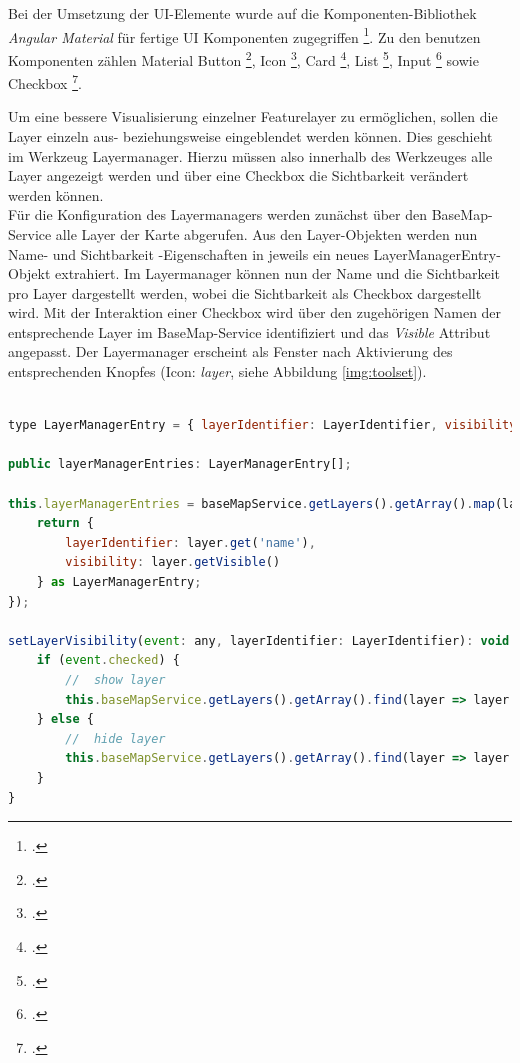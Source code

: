 Bei der Umsetzung der UI-Elemente wurde auf die Komponenten-Bibliothek \emph{Angular Material} für fertige UI Komponenten zugegriffen \footcite{team_angular_material}.
Zu den benutzen Komponenten zählen Material Button \footcite{team_angular_material_button}, Icon \footcite{team_angular_material_icon}, Card \footcite{team_angular_material_card}, List \footcite{team_angular_material_list}, Input \footcite{team_angular_material_input} sowie Checkbox \footcite{team_angular_material_checkbox}.

Um eine bessere Visualisierung einzelner Featurelayer zu ermöglichen, sollen die Layer einzeln aus- beziehungsweise eingeblendet werden können.
Dies geschieht im Werkzeug Layermanager.
Hierzu müssen also innerhalb des Werkzeuges alle Layer angezeigt werden und über eine Checkbox die Sichtbarkeit verändert werden können.\\
Für die Konfiguration des Layermanagers werden zunächst über den BaseMap-Service alle Layer der Karte abgerufen.
Aus den Layer-Objekten werden nun Name- und Sichtbarkeit -Eigenschaften in jeweils ein neues LayerManagerEntry-Objekt extrahiert.
Im Layermanager können nun der Name und die Sichtbarkeit pro Layer dargestellt werden, wobei die Sichtbarkeit als Checkbox dargestellt wird.
Mit der Interaktion einer Checkbox wird über den zugehörigen Namen der entsprechende Layer im BaseMap-Service identifiziert und das \emph{Visible} Attribut angepasst.
Der Layermanager erscheint als Fenster nach Aktivierung des entsprechenden Knopfes (Icon: \emph{layer}, siehe Abbildung \ref{img:toolset}).

\begin{lstlisting}[language=JavaScript]
	
type LayerManagerEntry = { layerIdentifier: LayerIdentifier, visibility: boolean };

public layerManagerEntries: LayerManagerEntry[];

this.layerManagerEntries = baseMapService.getLayers().getArray().map(layer => {
	return {
		layerIdentifier: layer.get('name'),
		visibility: layer.getVisible()
	} as LayerManagerEntry;
});

setLayerVisibility(event: any, layerIdentifier: LayerIdentifier): void {
	if (event.checked) {
		//  show layer
		this.baseMapService.getLayers().getArray().find(layer => layer.get('name') === layerIdentifier).setVisible(true);
	} else {
		//  hide layer
		this.baseMapService.getLayers().getArray().find(layer => layer.get('name') === layerIdentifier).setVisible(false);
	}
}
\end{lstlisting}

